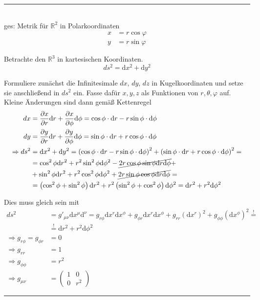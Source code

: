 \documentclass{article}
\newcommand{\diff}{\mathrm{d}}
\newcommand{\lr}[1]{\left(#1\right)}
\begin{document}
\newpage


{\color{violet}
\hrule
	\\
	ges: Metrik für $\mathbb{R}^2$ in Polarkoordinaten
		\begin{align*}
			x &= r\cos\varphi \\
			y &= r\sin\varphi
		\end{align*}
	
	Betrachte den $\mathbb{R}^3$ in kartesischen Koordinaten.
		$$ds^2 = \diff x^2 + \diff y^2$$

	Formuliere zunächst die Infinitesimale $dx$, $dy$, $dz$ in Kugelkoordinaten und setze sie anschließend in $ds^2$ ein. Fasse dafür $x,y,z$ als Funktionen von $r,\theta,\varphi$ auf. Kleine Änderungen sind dann gemäß Kettenregel
		\begin{align*}
			dx &= \frac{\partial x}{\partial r} \diff r + \frac{\partial x}{\partial\phi} \diff\phi = \cos\phi \cdot \diff r - r\sin\phi \cdot \diff\phi \\
			dy &= \frac{\partial y}{\partial r} \diff r + \frac{\partial y}{\partial\phi} \diff\phi = \sin\phi \cdot \diff r + r\cos\phi \cdot \diff\phi \\
			\Rightarrow ds^2 &= \diff x^2 + \diff y^2 =
			\lr{ \cos\phi \cdot \diff r - r\sin\phi \cdot \diff\phi }^2 + \lr{ \sin\phi \cdot \diff r + r\cos\phi \cdot \diff\phi }^2 = \\
			&= \cos^2\phi \diff r^2 + r^2\sin^2\phi \diff\phi^2 - \cancel{2r\cos\phi\sin\phi \diff r\diff \phi} + \\
			&+ \sin^2\phi \diff r^2 + r^2\cos^2\phi \diff\phi^2 + \cancel{2 r\sin\phi\cos\phi \diff r\diff \phi} = \\
			&= \lr{\cos^2\phi + \sin^2\phi}\diff r^2 + r^2\lr{\sin^2\phi + \cos^2\phi} \diff \phi^2 = \diff r^2 + r^2 \diff \phi^2
		\end{align*}
	
	Dies muss gleich sein mit
		\begin{align*}
			ds^2 &= g'_{\mu\nu} \diff x^\mu \diff^\nu = g_{r\phi} \diff x^r \diff x^\phi +  g_{\phi r} \diff x^r \diff x^\phi + g_{rr} (\diff x^r)^2 + g_{\phi\phi} (\diff x^\phi)^2 \stackrel{!}{=} \\
			&\stackrel{!}{=} \diff r^2 + r^2\diff\phi^2 \\
			\Rightarrow g_{r\phi} = g_{\phi r} &= 0\\
			\Rightarrow g_{rr} &= 1 \\
			\Rightarrow g_{\phi\phi} &= r^2\\
			\Rightarrow g_{\mu\nu} &= 
			\begin{pmatrix}
				1 & 0 \\
				0 & r^2
			\end{pmatrix}
		\end{align*}
\hrule
}
\end{document}
